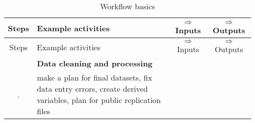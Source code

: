 \documentclass[]{book}
\begin{document}
\begin{longtable}[]{@{}clcc@{}}
\caption{\label{tab:workflow} Workflow basics}\tabularnewline
\toprule
\begin{minipage}[b]{0.07\columnwidth}\centering
Steps\strut
\end{minipage} & \begin{minipage}[b]{0.25\columnwidth}\raggedright
Example activities\strut
\end{minipage} & \begin{minipage}[b]{0.28\columnwidth}\centering
\(\Rightarrow\) Inputs\strut
\end{minipage} & \begin{minipage}[b]{0.29\columnwidth}\centering
\(\Rightarrow\) Outputs\strut
\end{minipage}\tabularnewline
\midrule
\endfirsthead
\toprule
\begin{minipage}[b]{0.07\columnwidth}\centering
Steps\strut
\end{minipage} & \begin{minipage}[b]{0.25\columnwidth}\raggedright
Example activities\strut
\end{minipage} & \begin{minipage}[b]{0.28\columnwidth}\centering
\(\Rightarrow\) Inputs\strut
\end{minipage} & \begin{minipage}[b]{0.29\columnwidth}\centering
\(\Rightarrow\) Outputs\strut
\end{minipage}\tabularnewline
\midrule
\endhead
\begin{minipage}[t]{0.07\columnwidth}\centering
1\strut
\end{minipage} & \begin{minipage}[t]{0.25\columnwidth}\raggedright
\textbf{Data cleaning and processing}\strut
\end{minipage} & \begin{minipage}[t]{0.28\columnwidth}\centering
\strut
\end{minipage} & \begin{minipage}[t]{0.29\columnwidth}\centering
\strut
\end{minipage}\tabularnewline
\begin{minipage}[t]{0.07\columnwidth}\centering
.\strut
\end{minipage} & \begin{minipage}[t]{0.25\columnwidth}\raggedright
make a plan for final datasets, fix data entry errors, create derived variables, plan for public replication files\strut

\end{minipage}
\end{longtable}
\end{document}
